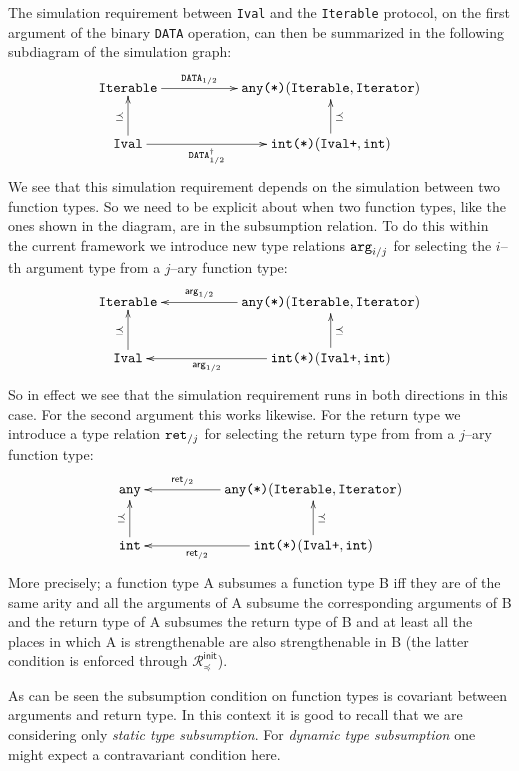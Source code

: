 \documentclass{sigplanconf}
\newcommand{\ms}[1]{\mathsf{#1}}
\newcommand{\mc}[1]{\mathcal{#1}}
\newcommand{\mt}[1]{\text{\tt #1}}
\begin{document}
The simulation requirement between \verb+Ival+ and the \verb+Iterable+
protocol, on the first argument of the binary \verb+DATA+ operation,
can then be summarized in the following subdiagram of the simulation
graph:
\begin{align*}
\xymatrix{
  \mt{Iterable} \ar@{<-}[d]_{\preceq} \ar@{->}[rr]^-{\mt{DATA}_{1/2}} 
  & & \mt{any(*)}(\mt{Iterable}, \mt{Iterator}) \ar@{<-}[d]^{\preceq} \\
  \mt{Ival} \ar[rr]_-{\mt{DATA}^\dagger_{1/2}} 
  & & \mt{int(*)}(\mt{Ival+}, \mt{int})
}
\end{align*}
We see that this simulation requirement depends on the simulation
between two function types. So we need to be explicit about when two
function types, like the ones shown in the diagram, are in the
subsumption relation. To do this within the current framework we
introduce new type relations $\mt{arg}_{i/j}$ for selecting the
$i$--th argument type from a $j$--ary function type:
\begin{align*}
\xymatrix{
  \mt{Iterable} \ar@{<-}[d]_{\preceq} \ar@{<-}[rr]^-{\ms{arg}_{1/2}} 
  & & \mt{any(*)}(\mt{Iterable}, \mt{Iterator}) \ar@{<-}[d]^{\preceq} \\
  \mt{Ival} \ar@{<-}[rr]_-{\ms{arg}_{1/2}} 
  & & \mt{int(*)}(\mt{Ival+}, \mt{int})
}
\end{align*}
So in effect we see that the simulation requirement runs in both
directions in this case. For the second argument this works
likewise. For the return type we introduce a type relation
$\mt{ret}_{/j}$ for selecting the return type from from a $j$--ary
function type:
\begin{align*}
\xymatrix{
  \mt{any} \ar@{<-}[d]_{\preceq} \ar@{<-}[rr]^-{\ms{ret}_{/2}} 
  & & \mt{any(*)}(\mt{Iterable}, \mt{Iterator}) \ar@{<-}[d]^{\preceq} \\
  \mt{int} \ar@{<-}[rr]_-{\ms{ret}_{/2}} 
  & & \mt{int(*)}(\mt{Ival+}, \mt{int})
}
\end{align*}
More precisely; a function type A subsumes a function type B iff they
are of the same arity and all the arguments of A subsume the
corresponding arguments of B and the return type of A subsumes the
return type of B and at least all the places in which A is
strengthenable are also strengthenable in B (the latter condition is
enforced through $\mc{R}^\ms{init}_\preceq$). 

As can be seen the subsumption condition on function types is
covariant between arguments and return type. In this context it is
good to recall that we are considering only \emph{static type
  subsumption}.  For \emph{dynamic type subsumption} one might expect
a contravariant condition here.
\end{document}
